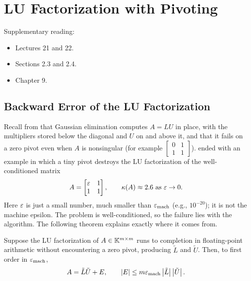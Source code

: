 \chapter{LU Factorization with Pivoting}
\label{ch:pivoting}

Supplementary reading:
\begin{itemize}
  \item \cite{TB} Lectures 21 and 22.
  \item \cite{Demmel} Sections 2.3 and 2.4.
  \item \cite{Higham} Chapter 9.
\end{itemize}

\section{Backward Error of the LU Factorization}

Recall from  that Gaussian elimination computes $A = LU$ in place, with the multipliers stored below the diagonal and $U$ on and above it, and that it fails on a zero pivot even when $A$ is nonsingular (for example $\begin{bmatrix} 0 & 1 \\ 1 & 1 \end{bmatrix}$).  ended with an example in which a tiny pivot destroys the LU factorization of the well-conditioned matrix
\begin{equation}
  A = \begin{bmatrix} \varepsilon & 1 \\ 1 & 1 \end{bmatrix}, \qquad \kappa(A) \approx 2.6 \text{ as } \varepsilon \to 0.
\end{equation}
Here $\varepsilon$ is just a small number, much smaller than $\varepsilon_{\mathrm{mach}}$ (e.g., $10^{-20}$); it is not the machine epsilon. The problem is well-conditioned, so the failure lies with the algorithm. The following theorem explains exactly where it comes from.

\begin{theorem}
  \label{thm:lu-backward}
  Suppose the LU factorization of $A \in \mathbb{K}^{m \times m}$ runs to completion in floating-point arithmetic without encountering a zero pivot, producing $\tilde{L}$ and $\tilde{U}$. Then, to first order in $\varepsilon_{\mathrm{mach}}$,
  \begin{equation}
    A = \tilde{L}\tilde{U} + E, \qquad \left\lvert E \right\rvert \le m\varepsilon_{\mathrm{mach}}\left\lvert \tilde{L} \right\rvert\left\lvert \tilde{U} \right\rvert.
  \end{equation}
\end{theorem}

